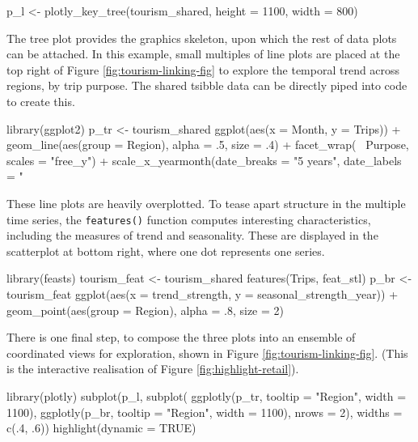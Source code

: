 \begin{Schunk}
\begin{Sinput}
p_l <- plotly_key_tree(tourism_shared, height = 1100, width = 800)
\end{Sinput}
\end{Schunk}

The tree plot provides the graphics skeleton, upon which the rest of
data plots can be attached. In this example, small multiples of line
plots are placed at the top right of Figure
\ref{fig:tourism-linking-fig} to explore the temporal trend across
regions, by trip purpose. The shared tsibble data can be directly piped
into  code to create this.

\begin{Schunk}
\begin{Sinput}
library(ggplot2)
p_tr <- tourism_shared %
  ggplot(aes(x = Month, y = Trips)) +
  geom_line(aes(group = Region), alpha = .5, size = .4) +
  facet_wrap(~ Purpose, scales = "free_y") +
  scale_x_yearmonth(date_breaks = "5 years", date_labels = "%
\end{Sinput}
\end{Schunk}

These line plots are heavily overplotted. To tease apart structure in
the multiple time series, the \texttt{features()} function computes
interesting characteristics, including the measures of trend and
seasonality. These are displayed in the scatterplot at bottom right,
where one dot represents one series.

\begin{Schunk}
\begin{Sinput}
library(feasts)
tourism_feat <- tourism_shared %
  features(Trips, feat_stl)
p_br <- tourism_feat %
  ggplot(aes(x = trend_strength, y = seasonal_strength_year)) +
  geom_point(aes(group = Region), alpha = .8, size = 2)
\end{Sinput}
\end{Schunk}

There is one final step, to compose the three plots into an ensemble of
coordinated views for exploration, shown in Figure
\ref{fig:tourism-linking-fig}. (This is the interactive realisation of
Figure \ref{fig:highlight-retail}).

\begin{Schunk}
\begin{Sinput}
library(plotly)
subplot(p_l,
  subplot(
    ggplotly(p_tr, tooltip = "Region", width = 1100),
    ggplotly(p_br, tooltip = "Region", width = 1100),
    nrows = 2),
  widths = c(.4, .6)) %
  highlight(dynamic = TRUE)
\end{Sinput}
\end{Schunk}

